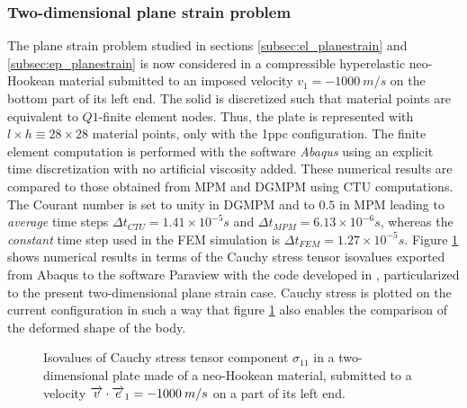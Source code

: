 \subsubsection*{Two-dimensional plane strain problem}
%   
The plane strain problem studied in sections \ref{subsec:el_planestrain} and \ref{subsec:ep_planestrain} is now considered in a compressible hyperelastic neo-Hookean material submitted to an imposed velocity $v_1=-1000 \: m/s$ on the bottom part of its left end.
The solid is discretized such that material points are equivalent to $Q1$-finite element nodes.
Thus, the plate is represented with $l \times h \equiv 28 \times 28$ material points, only with the 1ppc configuration.
The finite element computation is performed with the software \textit{Abaqus} \cite{Abaqus} using an explicit time discretization with no artificial viscosity added.
These numerical results are compared to those obtained from MPM and DGMPM using CTU computations.
The Courant number is set to unity in DGMPM and to $0.5$ in MPM leading to \textit{average} time steps $\Delta t_{CTU}=1.41 \times 10^{-5}s$ and $\Delta t_{MPM}=6.13 \times 10^{-6}s$, whereas the \textit{constant} time step used in the FEM simulation is $\Delta t_{FEM}=1.27 \times 10^{-5} s$.
Figure \ref{fig:2dhe_stress} shows numerical results in terms of the Cauchy stress tensor isovalues exported from Abaqus to the software Paraview \cite{Paraview} with the code developed in \cite{Export_Abaqus}, particularized to the present two-dimensional plane strain case.
Cauchy stress is plotted on the current configuration in such a way that figure \ref{fig:2dhe_stress} also enables the comparison of the deformed shape of the body.
\begin{figure}[h!]
  \centering
  
  \caption{Isovalues of Cauchy stress tensor component $\sigma_{11}$ in a two-dimensional plate made of a neo-Hookean material, submitted to a velocity ${\overrightarrow{v}}\cdot{\overrightarrow{e}}_1=-1000 \: m/s$ on a part of its left end.}
  \label{fig:2dhe_stress}
\end{figure}
